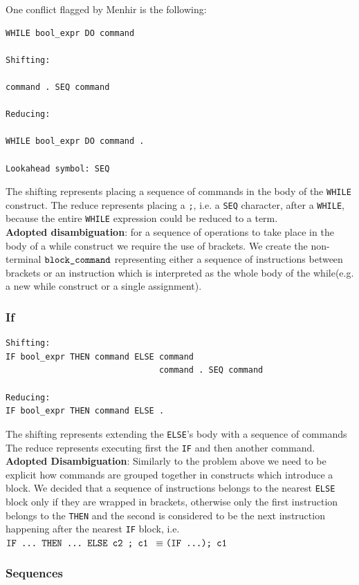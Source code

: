 \documentclass[a4paper,11pt]{report}
\begin{document}
	One conflict flagged by Menhir is the following:
	\begin{lstlisting}[caption={Shift-reduce conflict with while term}, captionpos = b]
WHILE bool_expr DO command

Shifting: 

command . SEQ command

Reducing:

WHILE bool_expr DO command .

Lookahead symbol: SEQ
	\end{lstlisting}
	The shifting represents placing a sequence of commands in the body of the \verb|WHILE| construct.
	The reduce represents placing a \verb|;|, i.e. a \verb|SEQ| character, after a \verb|WHILE|, because the entire \verb|WHILE| expression could be reduced to a term.\\
	\textbf{Adopted disambiguation}: for a sequence of operations to take place in the body of a while construct we require the use of brackets. We create the non-terminal $\verb|block_command|$ representing either a sequence of instructions between brackets or an instruction which is interpreted as the whole body of the while(e.g. a new while construct or a single assignment).
	
\subsubsection{If}
	\begin{lstlisting}[caption={Shift-reduce conflict with if term}, captionpos=b]
Shifting: 
IF bool_expr THEN command ELSE command 
                               command . SEQ command

Reducing: 
IF bool_expr THEN command ELSE .
	\end{lstlisting}
	The shifting represents extending the \verb|ELSE|'s body with a sequence of commands
	The reduce represents executing first the \verb|IF| and then another command.\\
	\textbf{Adopted Disambiguation}: 
	Similarly to the problem above we need to be explicit how commands are grouped together in constructs which introduce a block. We decided that a sequence of instructions belongs to the nearest \verb|ELSE| block only if they are wrapped in brackets, otherwise only the first instruction belongs to the \verb|THEN| and the second is considered to be the next instruction happening after the nearest \verb|IF| block, i.e. $\verb|IF ... THEN ... ELSE c2 ; c1 | \equiv \verb|(IF ...); c1|$
	\subsubsection {Sequences}
	
\end{document}
